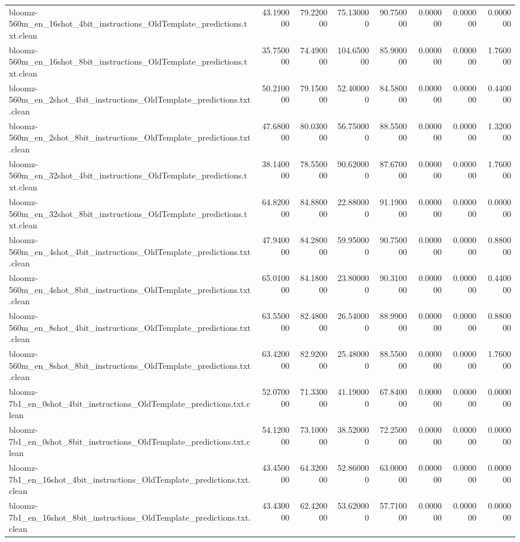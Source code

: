 \begin{tabular}{lrrrrrrr}
bloomz-560m_en_16shot_4bit_instructions_OldTemplate_predictions.txt.clean & 43.190000 & 79.220000 & 75.130000 & 90.750000 & 0.000000 & 0.000000 & 0.000000 \\
bloomz-560m_en_16shot_8bit_instructions_OldTemplate_predictions.txt.clean & 35.750000 & 74.490000 & 104.650000 & 85.900000 & 0.000000 & 0.000000 & 1.760000 \\
bloomz-560m_en_2shot_4bit_instructions_OldTemplate_predictions.txt.clean & 50.210000 & 79.150000 & 52.400000 & 84.580000 & 0.000000 & 0.000000 & 0.440000 \\
bloomz-560m_en_2shot_8bit_instructions_OldTemplate_predictions.txt.clean & 47.680000 & 80.030000 & 56.750000 & 88.550000 & 0.000000 & 0.000000 & 1.320000 \\
bloomz-560m_en_32shot_4bit_instructions_OldTemplate_predictions.txt.clean & 38.140000 & 78.550000 & 90.620000 & 87.670000 & 0.000000 & 0.000000 & 1.760000 \\
bloomz-560m_en_32shot_8bit_instructions_OldTemplate_predictions.txt.clean & 64.820000 & 84.880000 & 22.880000 & 91.190000 & 0.000000 & 0.000000 & 0.000000 \\
bloomz-560m_en_4shot_4bit_instructions_OldTemplate_predictions.txt.clean & 47.940000 & 84.280000 & 59.950000 & 90.750000 & 0.000000 & 0.000000 & 0.880000 \\
bloomz-560m_en_4shot_8bit_instructions_OldTemplate_predictions.txt.clean & 65.010000 & 84.180000 & 23.800000 & 90.310000 & 0.000000 & 0.000000 & 0.440000 \\
bloomz-560m_en_8shot_4bit_instructions_OldTemplate_predictions.txt.clean & 63.550000 & 82.480000 & 26.540000 & 88.990000 & 0.000000 & 0.000000 & 0.880000 \\
bloomz-560m_en_8shot_8bit_instructions_OldTemplate_predictions.txt.clean & 63.420000 & 82.920000 & 25.480000 & 88.550000 & 0.000000 & 0.000000 & 1.760000 \\
bloomz-7b1_en_0shot_4bit_instructions_OldTemplate_predictions.txt.clean & 52.070000 & 71.330000 & 41.190000 & 67.840000 & 0.000000 & 0.000000 & 0.000000 \\
bloomz-7b1_en_0shot_8bit_instructions_OldTemplate_predictions.txt.clean & 54.120000 & 73.100000 & 38.520000 & 72.250000 & 0.000000 & 0.000000 & 0.000000 \\
bloomz-7b1_en_16shot_4bit_instructions_OldTemplate_predictions.txt.clean & 43.450000 & 64.320000 & 52.860000 & 63.000000 & 0.000000 & 0.000000 & 0.000000 \\
bloomz-7b1_en_16shot_8bit_instructions_OldTemplate_predictions.txt.clean & 43.430000 & 62.420000 & 53.620000 & 57.710000 & 0.000000 & 0.000000 & 0.000000 \\

\end{tabular}
